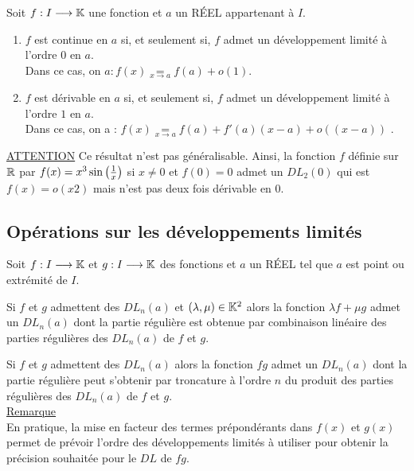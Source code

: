 \begin{defprop}
    Soit \(f : I \longrightarrow  \mathbb{K}\) une fonction et \(a\) un RÉEL appartenant à \(I\).
    \begin{enumerate}
    \item \(f\) est continue en \(a\) si, et seulement si, \(f\) admet un développement limité à l’ordre \(0\) en \(a\).\\
        Dans ce cas, on \(a : f (x) \underset{x\to a}{=} f (a) + o(1)\).
    \item \(f\) est dérivable en \(a\) si, et seulement si, \(f\) admet un développement limité à l’ordre \(1\) en \(a\).\\
        Dans ce cas, on a : \(f (x) \underset{x\to a}{=} f (a) + f '(a)(x - a) + o ((x - a))\) .
    \end{enumerate}
    \underline{ATTENTION}
Ce résultat n’est pas généralisable. Ainsi, la fonction \(f\) définie sur \(\mathbb{R}\) par \(f (x) = x^3 \sin\left(\frac{1}{x}\right)\) si \(x\neq 0\) et \(f (0) = 0\) admet un \(DL_2(0)\) qui est \(f (x) = o(x2)\) mais n’est pas deux fois dérivable en \(0\).
\end{defprop}

\subsection{Opérations sur les développements limités}
Soit \(f : I \longrightarrow  \mathbb{K}\) et \(g : I \longrightarrow  \mathbb{K}\) des fonctions et \(a\) un RÉEL tel que \(a\) est point ou extrémité de \(I\).

\begin{defprop}
    Si \(f\) et \(g\) admettent des \(DL_n(a)\) et \((\lambda , \mu) \in  \mathbb{K}^2\) alors la fonction \(\lambda f + \mu g\) admet un \(DL_n(a)\) dont la partie régulière est obtenue par combinaison linéaire des parties régulières des \(DL_n(a)\) de \(f \) et \(g\).
\end{defprop}

\begin{defprop}[Produit]
    Si \(f\) et \(g\) admettent des \(DL_n(a)\) alors la fonction \(f g\) admet un \(DL_n(a)\) dont la partie régulière peut s’obtenir par troncature à l’ordre \(n\) du produit des parties régulières des \(DL_n(a)\) de \(f\) et \(g\).\\
    \underline{Remarque}\\
    En pratique, la mise en facteur des termes prépondérants dans \(f (x)\) et \(g(x)\) permet de prévoir l’ordre des développements limités à utiliser pour obtenir la précision souhaitée pour le \(DL\) de \(f g\).
\end{defprop}

